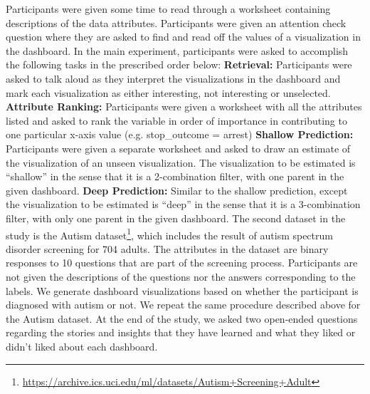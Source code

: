 \par Participants were given some time to read through a worksheet containing descriptions of the data attributes. Participants were given an attention check question where they are asked to find and read off the values of a visualization in the dashboard. In the main experiment, participants were asked to accomplish the following tasks in the prescribed order below:
\textbf{Retrieval:} Participants were asked to talk aloud as they interpret the visualizations in the dashboard and mark each visualization as either interesting, not interesting or unselected.
\textbf{Attribute Ranking:} Participants were given a worksheet with all the attributes listed and asked to rank the variable in order of importance in contributing to one particular x-axis value (e.g. stop_outcome = arrest)
\textbf{Shallow Prediction:} Participants were given a separate worksheet and asked to draw an estimate of the visualization of an unseen visualization. The visualization to be estimated is ``shallow'' in the sense that it is a 2-combination filter, with one parent in the given dashboard. 
\textbf{Deep Prediction:} Similar to the shallow prediction, except the visualization to be estimated is ``deep'' in the sense that it is a 3-combination filter, with only one parent in the given dashboard. 
The second dataset in the study is the Autism dataset\footnote{\url{https://archive.ics.uci.edu/ml/datasets/Autism+Screening+Adult}}, which includes the result of autism spectrum disorder screening for 704 adults. The attributes in the dataset are  binary responses to 10 questions that are part of the screening process. Participants are not given the descriptions of the questions nor the answers corresponding to the labels. We generate dashboard visualizations based on whether the participant is diagnosed with autism or not. We repeat the same procedure described above for the Autism dataset. At the end of the study, we asked two open-ended questions regarding the stories and insights that they have learned and what they liked or didn't liked about each dashboard.
